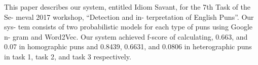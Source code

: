 This paper describes our system, entitled Idiom Savant, for the 7th Task of the Se- meval 2017 workshop, ``Detection and in- terpretation of English Puns''. Our sys- tem consists of two probabilistic models for each type of puns using Google n- gram and Word2Vec. Our system achieved f-score of calculating, 0.663, and 0.07 in homographic puns and 0.8439, 0.6631, and 0.0806 in heterographic puns in task 1, task 2, and task 3 respectively.
